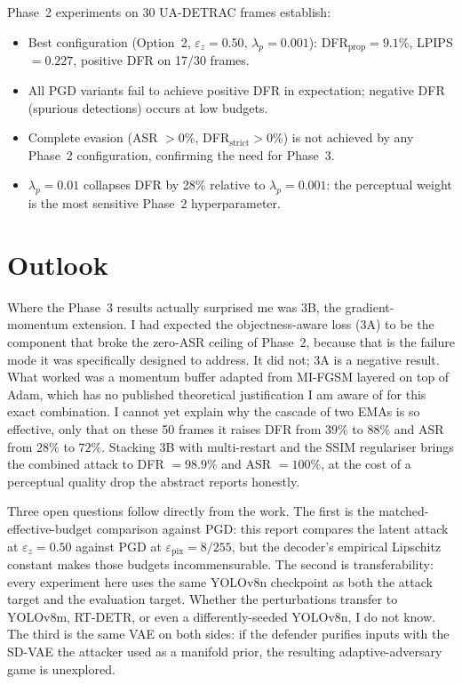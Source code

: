 \documentclass[12pt,a4paper]{report}
\begin{document}
Phase~2 experiments on 30 UA-DETRAC frames establish:
\begin{itemize}[itemsep=3pt]
  \item Best configuration (Option~2, $\varepsilon_z=0.50$, $\lambda_p=0.001$):
    DFR$_{\text{prop}} = 9.1\%$, LPIPS $= 0.227$, positive DFR on 17/30 frames.
  \item All PGD variants fail to achieve positive DFR in expectation; negative DFR
    (spurious detections) occurs at low budgets.
  \item Complete evasion (ASR $> 0\%$, DFR$_{\text{strict}} > 0\%$) is not achieved
    by any Phase~2 configuration, confirming the need for Phase~3.
  \item $\lambda_p = 0.01$ collapses DFR by 28\% relative to $\lambda_p = 0.001$:
    the perceptual weight is the most sensitive Phase~2 hyperparameter.
\end{itemize}

\section{Outlook}
\label{sec:outlook}

Where the Phase~3 results actually surprised me was 3B, the gradient-momentum
extension. I had expected the objectness-aware loss (3A) to be the component
that broke the zero-ASR ceiling of Phase~2, because that is the failure mode
it was specifically designed to address. It did not; 3A is a negative result.
What worked was a momentum buffer adapted from MI-FGSM layered on top of Adam,
which has no published theoretical justification I am aware of for this exact
combination. I cannot yet explain why the cascade of two EMAs is so effective,
only that on these 50 frames it raises DFR from $39\%$ to $88\%$ and ASR from
$28\%$ to $72\%$. Stacking 3B with multi-restart and the SSIM regulariser
brings the combined attack to DFR $= 98.9\%$ and ASR $= 100\%$, at the cost
of a perceptual quality drop the abstract reports honestly.

Three open questions follow directly from the work. The first is the
matched-effective-budget comparison against PGD: this report compares the latent
attack at $\varepsilon_z = 0.50$ against PGD at $\varepsilon_{\text{pix}} = 8/255$,
but the decoder's empirical Lipschitz constant makes those budgets incommensurable.
The second is transferability: every experiment here uses the same YOLOv8n
checkpoint as both the attack target and the evaluation target. Whether the
perturbations transfer to YOLOv8m, RT-DETR, or even a differently-seeded
YOLOv8n, I do not know. The third is the same VAE on both sides: if the
defender purifies inputs with the SD-VAE the attacker used as a manifold prior,
the resulting adaptive-adversary game is unexplored.
\end{document}
